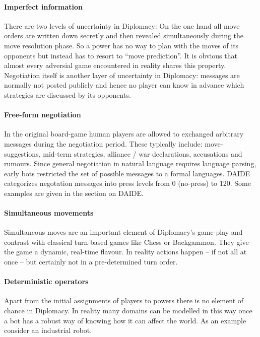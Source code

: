 \documentclass[pdftex,11pt,a4paper]{report}
\begin{document}
\paragraph{Imperfect information}
There are two levels of uncertainty in Diplomacy: On the one hand all
move orders are written down secretly and then revealed simultaneously
during the move resolution phase. So a power has no way to plan with
the moves of its opponents but instead has to resort to ``move
prediction''. It is obvious that almost every adversial game
encountered in reality shares this property. Negotiation itself is
another layer of uncertainty in Diplomacy: messages are normally not
posted publicly and hence no player can know in advance which
strategies are discussed by its opponents.

\paragraph{Free-form negotiation}
In the original board-game human players are allowed to exchanged
arbitrary messages during the negotiation period. These typically
include: move-suggestions, mid-term strategies, alliance / war
declarations, accusations and rumours. Since general negotiation
in natural language requires language parsing, early 
bots \cite{Kraus89} restricted the set of possible messages to 
a formal languages. DAIDE categorizes negotation messages 
into press levels \cite{DAIDEsyntax10} from 0 (no-press) to 120.
Some examples are given in the section on DAIDE.

\paragraph{Simultaneous movements} 
Simultaneous moves are an important element of Diplomacy's game-play
and contrast with classical turn-based games like Chess or
Backgammon. They give the game a dynamic, real-time flavour. In
reality actions happen -- if not all at once -- but certainly not in a
pre-determined turn order.

\paragraph{Deterministic operators}
Apart from the initial assignments of players to powers there is no
element of chance in Diplomacy. In reality many domains can be
modelled in this way once a bot has a robust way of knowing how it 
can affect the world. As an example consider an industrial robot.
\end{document}
